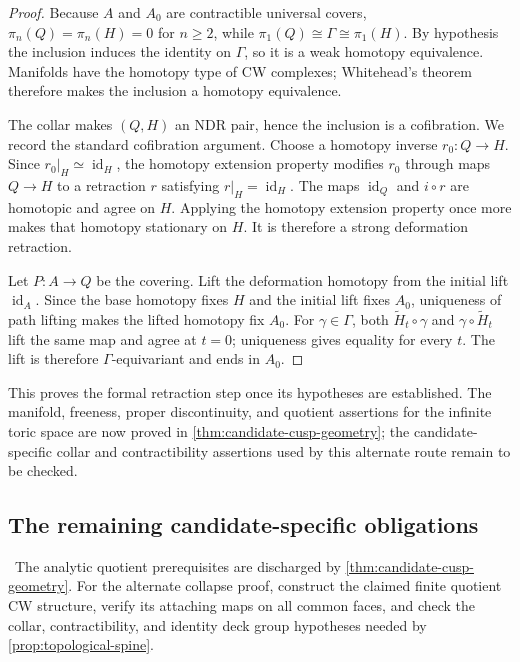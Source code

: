 \begin{proof}
Because $A$ and $A_0$ are contractible universal covers,
$\pi_n(Q)=\pi_n(H)=0$ for $n\ge2$, while
$\pi_1(Q)\cong\Gamma\cong\pi_1(H)$.  By hypothesis the inclusion induces the
identity on $\Gamma$, so it is a weak homotopy equivalence.  Manifolds have
the homotopy type of CW complexes; Whitehead's theorem
\cite[Theorem~4.5]{Hatcher2002} therefore makes the inclusion a homotopy
equivalence.

The collar makes $(Q,H)$ an NDR pair, hence the inclusion is a cofibration.
We record the standard cofibration argument.  Choose a homotopy inverse
$r_0:Q\to H$.  Since $r_0|_H\simeq\operatorname{id}_H$, the homotopy
extension property modifies $r_0$ through maps $Q\to H$ to a retraction
$r$ satisfying $r|_H=\operatorname{id}_H$.  The maps
$\operatorname{id}_Q$ and $i\circ r$ are homotopic and agree on $H$.
Applying the homotopy extension property once more makes that homotopy
stationary on $H$.  It is therefore a strong deformation retraction.

Let $P:A\to Q$ be the covering.  Lift the deformation homotopy from the
initial lift $\operatorname{id}_A$.  Since the base homotopy fixes $H$ and
the initial lift fixes $A_0$, uniqueness of path lifting makes the lifted
homotopy fix $A_0$.  For $\gamma\in\Gamma$, both
$\widetilde H_t\circ\gamma$ and $\gamma\circ\widetilde H_t$ lift the same
map and agree at $t=0$; uniqueness gives equality for every $t$.  The lift is
therefore $\Gamma$-equivariant and ends in $A_0$.
\end{proof}

This proves the formal retraction step once its hypotheses are established.
The manifold, freeness, proper discontinuity, and quotient assertions for the
infinite toric space are now proved in
\cref{thm:candidate-cusp-geometry}; the candidate-specific collar and
contractibility assertions used by this alternate route remain to be checked.

\subsection{The remaining candidate-specific obligations}

\begin{obligation}
\label{obl:finite-model}
\Open\ The analytic quotient prerequisites are discharged by
\cref{thm:candidate-cusp-geometry}.  For the alternate collapse proof,
construct the claimed finite quotient CW structure, verify its attaching maps
on all common faces, and check the collar, contractibility, and identity deck
group hypotheses needed by \cref{prop:topological-spine}.
\end{obligation}

